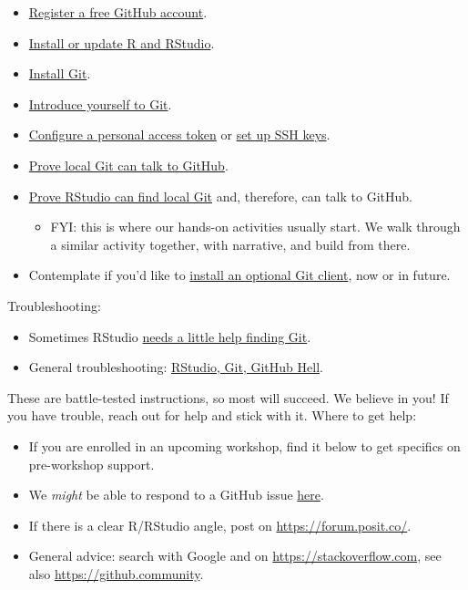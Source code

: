 \documentclass[
]{book}
\providecommand{\tightlist}{%
  \setlength{\itemsep}{0pt}\setlength{\parskip}{0pt}}
\begin{document}
\begin{itemize}
\tightlist
\item
  \hyperref[github-acct]{Register a free GitHub account}.
\item
  \hyperref[install-r-rstudio]{Install or update R and RStudio}.
\item
  \hyperref[install-git]{Install Git}.
\item
  \hyperref[hello-git]{Introduce yourself to Git}.
\item
  \hyperref[https-pat]{Configure a personal access token} or \hyperref[ssh-keys]{set up SSH keys}.
\item
  \hyperref[push-pull-github]{Prove local Git can talk to GitHub}.
\item
  \hyperref[rstudio-git-github]{Prove RStudio can find local Git} and, therefore, can talk to GitHub.

  \begin{itemize}
  \tightlist
  \item
    FYI: this is where our hands-on activities usually start. We walk through a similar activity together, with narrative, and build from there.
  \end{itemize}
\item
  Contemplate if you'd like to \hyperref[git-client]{install an optional Git client}, now or in future.
\end{itemize}

Troubleshooting:

\begin{itemize}
\tightlist
\item
  Sometimes RStudio \hyperref[rstudio-see-git]{needs a little help finding Git}.
\item
  General troubleshooting: \hyperref[troubleshooting]{RStudio, Git, GitHub Hell}.
\end{itemize}

These are battle-tested instructions, so most will succeed. We believe in you! If you have trouble, reach out for help and stick with it. Where to get help:

\begin{itemize}
\tightlist
\item
  If you are enrolled in an upcoming workshop, find it below to get specifics on pre-workshop support.
\item
  We \emph{might} be able to respond to a GitHub issue \href{https://github.com/jennybc/happy-git-with-r/issues}{here}.
\item
  If there is a clear R/RStudio angle, post on \url{https://forum.posit.co/}.
\item
  General advice: search with Google and on \url{https://stackoverflow.com}, see also \url{https://github.community}.
\end{itemize}
\end{document}
